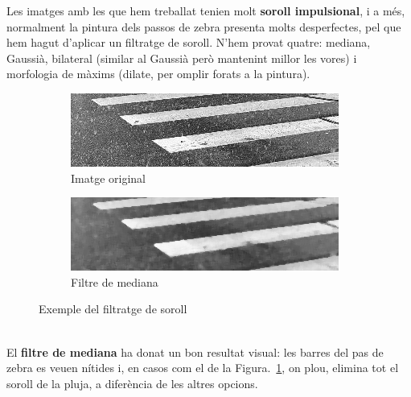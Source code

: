 \documentclass[10pt,a4paper,twocolumn,twoside]{article}
\begin{document}
Les imatges amb les que hem treballat tenien molt \textbf{soroll impulsional}, i a més, normalment la pintura dels passos de zebra presenta molts desperfectes, pel que hem hagut d'aplicar un filtratge de soroll. N'hem provat quatre: mediana, Gaussià, bilateral (similar al Gaussià però mantenint millor les vores) i morfologia de màxims (dilate, per omplir forats a la pintura).
\begin{figure}[!h]
	\centering
	\begin{subfigure}{0.46\columnwidth}
		\includegraphics[width=\linewidth]{figs/neu1}
		\caption{Imatge original}
	\end{subfigure}
	\quad
	\begin{subfigure}{0.46\columnwidth}
		\includegraphics[width=\linewidth]{figs/med_neu1}
		\caption{Filtre de mediana}
	\end{subfigure}
	\caption{Exemple del filtratge de soroll}
	\label{fig:soroll}
\end{figure}
\\
El \textbf{filtre de mediana} ha donat un bon resultat visual: les barres del pas de zebra es veuen nítides i, en casos com el de la Figura.~\ref{fig:soroll}, on plou, elimina tot el soroll de la pluja, a diferència de les altres opcions.
\end{document}
